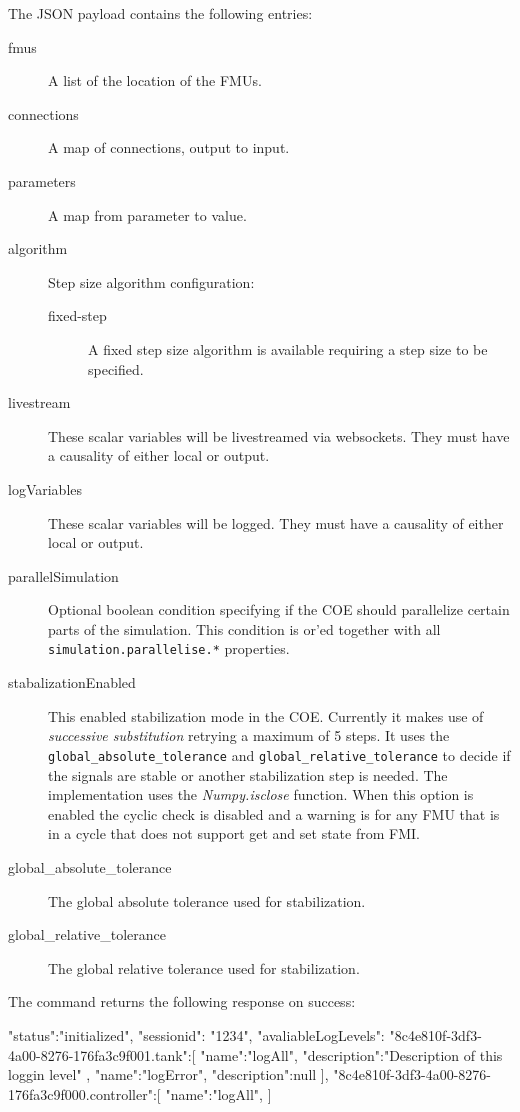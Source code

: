 \noindent The JSON payload contains the following entries:

\begin{description}
	\item[fmus] A list of the location of the FMUs.
	\item[connections] A map of connections, output to input.
	\item[parameters] A map from parameter to value.
	\item[algorithm] Step size algorithm configuration:
	\begin{description}
		\item[fixed-step] A fixed step size algorithm is available requiring a step size to be specified.
	\end{description}
	\item[livestream] These scalar variables will be livestreamed via websockets. They must have a causality of either local or output.
	\item[logVariables] These scalar variables will be logged. They must have a causality of either local or output.
	\item[parallelSimulation] Optional boolean condition specifying if the COE should parallelize certain parts of the simulation. This condition is or'ed together with all \texttt{simulation.parallelise.*} properties.
	\item[stabalizationEnabled] This enabled stabilization mode in the COE. Currently it makes use of \textit{successive substitution} retrying a maximum of 5 steps. It uses the \texttt{global\_absolute\_tolerance} and \texttt{global\_relative\_tolerance} to decide if the signals are stable or another stabilization step is needed. The implementation uses the \textit{Numpy.isclose} function. When this option is enabled the cyclic check is disabled and a warning is for any FMU that is in a cycle that does not support get and set state from FMI.
	\item [global\_absolute\_tolerance] The global absolute tolerance used for stabilization.
	\item [global\_relative\_tolerance] The global relative tolerance used for stabilization.
\end{description}

\noindent The command returns the following response on success:

\begin{json}
	{
		"status":"initialized",
		"sessionid": "1234",
		"avaliableLogLevels":{
			"{8c4e810f-3df3-4a00-8276-176fa3c9f001}.tank":[
			{
				"name":"logAll",
				"description":"Description of this loggin level"
			},
			{
				"name":"logError",
				"description":null
			}],
			"{8c4e810f-3df3-4a00-8276-176fa3c9f000}.controller":[
			{
				"name":"logAll",
			}]
		}
	}
\end{json}

